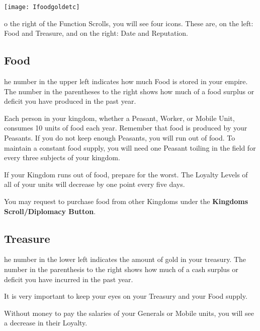 
\begin{center}
	\texttt{[image: Ifoodgoldetc]} %
\end{center}

o the right of the Function Scrolls, you will see four icons. These are, on the left: Food and Treasure, and on the right: Date and Reputation.

\subsection{Food}


he number in the upper left indicates how much Food is stored in your empire. The number in the parentheses to the right shows how much of a food surplus or deficit you have produced in the past year.

Each person in your kingdom, whether a Peasant, Worker, or Mobile Unit, consumes 10 units of food each year. Remember that food is produced by your Peasants. If you do not keep enough Peasants, you will run out of food. To maintain a constant food supply, you will need one Peasant toiling in the field for every three subjects of your kingdom.

If your Kingdom runs out of food, prepare for the worst. The Loyalty Levels of all of your units will decrease by one point every five days.

You may request to purchase food from other Kingdoms under the \textbf{Kingdoms Scroll/Diplomacy Button}.

\subsection{Treasure}


he number in the lower left indicates the amount of gold in your treasury. The number in the parenthesis to the right shows how much of a cash surplus or deficit you have incurred in the past year.

It is very important to keep your eyes on your Treasury and your Food supply.

Without money to pay the salaries of your Generals or Mobile units, you will see a decrease in their Loyalty.


